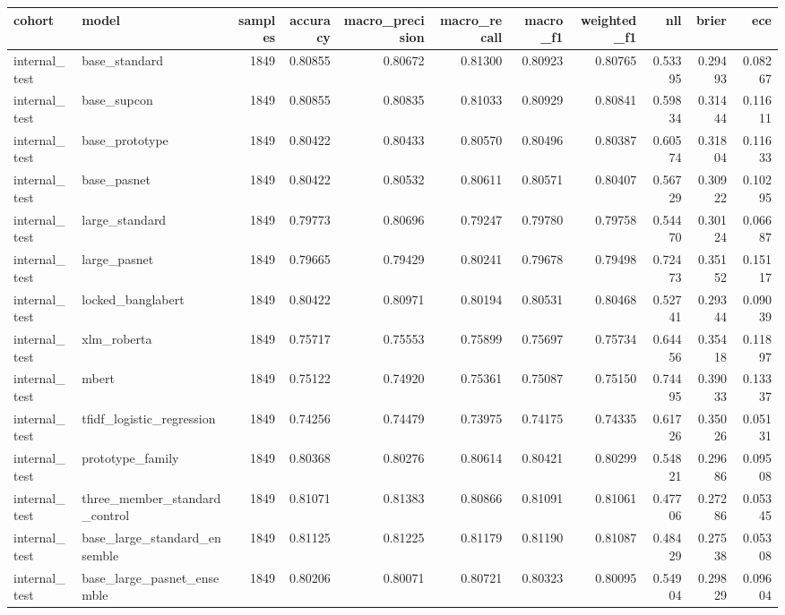 \begin{tabular}{llrrrrrrrrr}
\toprule
cohort & model & samples & accuracy & macro\_precision & macro\_recall & macro\_f1 & weighted\_f1 & nll & brier & ece \\
\midrule
internal\_test & base\_standard & 1849 & 0.80855 & 0.80672 & 0.81300 & 0.80923 & 0.80765 & 0.53395 & 0.29493 & 0.08267 \\
internal\_test & base\_supcon & 1849 & 0.80855 & 0.80835 & 0.81033 & 0.80929 & 0.80841 & 0.59834 & 0.31444 & 0.11611 \\
internal\_test & base\_prototype & 1849 & 0.80422 & 0.80433 & 0.80570 & 0.80496 & 0.80387 & 0.60574 & 0.31804 & 0.11633 \\
internal\_test & base\_pasnet & 1849 & 0.80422 & 0.80532 & 0.80611 & 0.80571 & 0.80407 & 0.56729 & 0.30922 & 0.10295 \\
internal\_test & large\_standard & 1849 & 0.79773 & 0.80696 & 0.79247 & 0.79780 & 0.79758 & 0.54470 & 0.30124 & 0.06687 \\
internal\_test & large\_pasnet & 1849 & 0.79665 & 0.79429 & 0.80241 & 0.79678 & 0.79498 & 0.72473 & 0.35152 & 0.15117 \\
internal\_test & locked\_banglabert & 1849 & 0.80422 & 0.80971 & 0.80194 & 0.80531 & 0.80468 & 0.52741 & 0.29344 & 0.09039 \\
internal\_test & xlm\_roberta & 1849 & 0.75717 & 0.75553 & 0.75899 & 0.75697 & 0.75734 & 0.64456 & 0.35418 & 0.11897 \\
internal\_test & mbert & 1849 & 0.75122 & 0.74920 & 0.75361 & 0.75087 & 0.75150 & 0.74495 & 0.39033 & 0.13337 \\
internal\_test & tfidf\_logistic\_regression & 1849 & 0.74256 & 0.74479 & 0.73975 & 0.74175 & 0.74335 & 0.61726 & 0.35026 & 0.05131 \\
internal\_test & prototype\_family & 1849 & 0.80368 & 0.80276 & 0.80614 & 0.80421 & 0.80299 & 0.54821 & 0.29686 & 0.09508 \\
internal\_test & three\_member\_standard\_control & 1849 & 0.81071 & 0.81383 & 0.80866 & 0.81091 & 0.81061 & 0.47706 & 0.27286 & 0.05345 \\
internal\_test & base\_large\_standard\_ensemble & 1849 & 0.81125 & 0.81225 & 0.81179 & 0.81190 & 0.81087 & 0.48429 & 0.27538 & 0.05308 \\
internal\_test & base\_large\_pasnet\_ensemble & 1849 & 0.80206 & 0.80071 & 0.80721 & 0.80323 & 0.80095 & 0.54904 & 0.29829 & 0.09604 \\
\bottomrule
\end{tabular}
